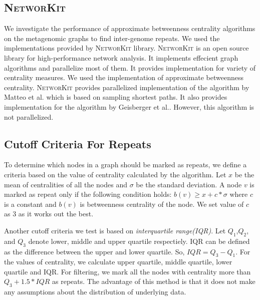 \documentclass[runningheads,a4paper]{llncs}
\begin{document}
\subsection*{\textsc{NetworKit}}
We investigate the performance of approximate betweenness centrality algorithms on the metagenomic graphs to find inter-genome repeats. We used the implementations provided by \textsc{NetworKit}\cite{networkit} library. \textsc{NetworKit} is an open source library for high-performance network analysis. It implements effecient graph algorithms and parallelize most of them. It provides implementation for variety of centrality measures. We used the implementation of approximate betweenness centrality. \textsc{NetworKit} provides parallelized implementation of the algorithm by Matteo et al.\cite{matteo} which is based on sampling shortest paths. It also provides implementation for the algorithm by Geisberger et al.\cite{sanders}. However, this algorithm is not parallelized. 


\subsection*{Cutoff Criteria For Repeats}
To determine which nodes in a graph should be marked as repeats, we define a criteria based on the value of centrality calculated by the algorithm. Let $x$ be the mean of centralities of all the nodes and $\sigma$ be the standard deviation. A node $v$ is marked as repeat only if the following condition holds: $b(v) \geq x + c*\sigma$ where $c$ is a constant and $b(v)$ is betweenness centrality of the node. We set value of $c$ as 3 as it works out the best.

Another cutoff criteria we test is based on \textit{interquartile range(IQR)}. Let $Q_{1}$,$Q_{2}$, and $Q_{3}$ denote lower, middle and upper quartile respectiely. IQR can be defined as the difference between the upper and lower quartile. So, $IQR = Q_{3} - Q_{1}$. For the values of centrality, we calculate upper quartile, middle quartile, lower quartile and IQR. For filtering, we mark all the nodes with centrality more than $Q_{3} + 1.5*IQR$ as repeats. The advantage of this method is that it does not make any assumptions about the distribution of underlying data.  
\end{document}
